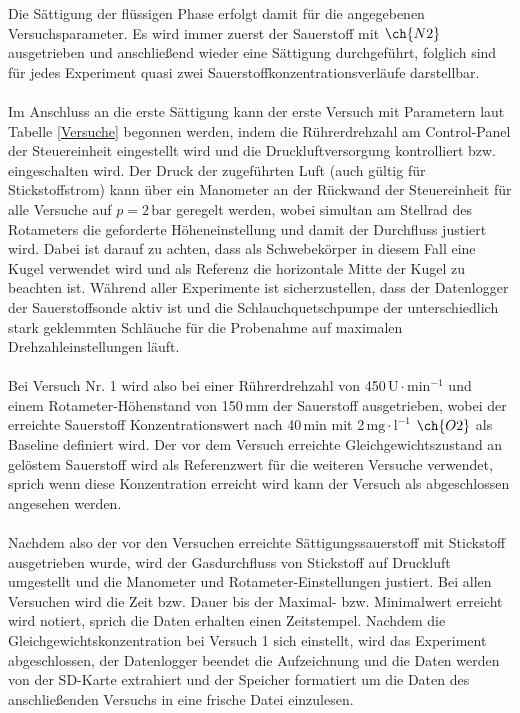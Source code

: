 \documentclass[12pt,liststotoc]{report}
\begin{document}
Die Sättigung der flüssigen Phase erfolgt damit für die angegebenen Versuchsparameter. Es wird immer zuerst der Sauerstoff mit $\ch{N2}$ ausgetrieben und anschließend wieder eine Sättigung durchgeführt, folglich sind für jedes Experiment quasi zwei Sauerstoffkonzentrationsverläufe darstellbar. 
\\
\\
Im Anschluss an die erste Sättigung kann der erste Versuch mit Parametern laut Tabelle \ref{Versuche} begonnen werden, indem die Rührerdrehzahl am Control-Panel der Steuereinheit eingestellt wird und die Druckluftversorgung kontrolliert bzw. eingeschalten wird. Der Druck der zugeführten Luft (auch gültig für Stickstoffstrom) kann über ein Manometer an der Rückwand der Steuereinheit für alle Versuche auf $p=2\,\text{bar}$ geregelt werden, wobei simultan am Stellrad des Rotameters die geforderte Höheneinstellung und damit der Durchfluss justiert wird. Dabei ist darauf zu achten, dass als Schwebekörper in diesem Fall eine Kugel verwendet wird und als Referenz die horizontale Mitte der Kugel zu beachten ist. Während aller Experimente ist sicherzustellen, dass der Datenlogger der Sauerstoffsonde aktiv ist und die Schlauchquetschpumpe der unterschiedlich stark geklemmten Schläuche für die Probenahme auf maximalen Drehzahleinstellungen läuft.
\\
\\
Bei Versuch Nr. 1 wird also bei einer Rührerdrehzahl von 450\,$\text{U} \cdot \text{min}^{-1}$ und einem Rotameter-Höhenstand von 150\,mm der Sauerstoff ausgetrieben, wobei der erreichte Sauerstoff Konzentrationswert nach 40\,min mit 2\,$\text{mg} \cdot \text{l}^{-1}$ $\ch{O2}$ als Baseline definiert wird. Der vor dem Versuch erreichte Gleichgewichtszustand an gelöstem Sauerstoff wird als Referenzwert für die weiteren Versuche verwendet, sprich wenn diese Konzentration erreicht wird kann der Versuch als abgeschlossen angesehen werden. 
\\
\\
Nachdem also der vor den Versuchen erreichte Sättigungssauerstoff mit Stickstoff ausgetrieben wurde, wird der Gasdurchfluss von Stickstoff auf Druckluft umgestellt und die Manometer und Rotameter-Einstellungen justiert. Bei allen Versuchen wird die Zeit bzw. Dauer bis der Maximal- bzw. Minimalwert erreicht wird notiert, sprich die Daten erhalten einen Zeitstempel. Nachdem die Gleichgewichtskonzentration bei Versuch 1 sich einstellt, wird das Experiment abgeschlossen, der Datenlogger beendet die Aufzeichnung und die Daten werden von der SD-Karte extrahiert und der Speicher formatiert um die Daten des anschließenden Versuchs in eine frische Datei einzulesen. 
\end{document}
